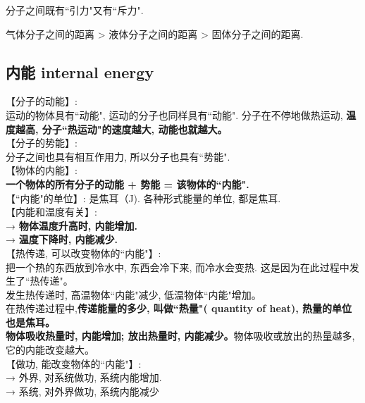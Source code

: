 \documentclass[UTF8]{ctexart}
\begin{document}
	分子之间既有``引力"又有``斥力".
	
	气体分子之间的距离 >  液体分子之间的距离 > 固体分子之间的距离.
	
	\vspace{1em} 
	
	
	
	\subsection{内能 internal energy}
	
	【分子的动能】: \\	
	运动的物体具有``动能", 运动的分子也同样具有``动能". 分子在不停地做热运动, \textbf{温度越高, 分子``热运动"的速度越大, 动能也就越大。} \\	
	
	【分子的势能】: \\
	分子之间也具有相互作用力, 所以分子也具有``势能". \\
		
	【物体的内能】: \\
	\textbf{一个物体的所有分子的动能 + 势能 = 该物体的``内能".}  \\
	
	
	【``内能"的单位】: 是焦耳（J). 各种形式能量的单位, 都是焦耳. \\
	
	【内能和温度有关】: \\
	→ \textbf{物体温度升高时, 内能增加.}  \\
	→ \textbf{温度下降时, 内能减少.} \\
	
	【热传递, 可以改变物体的``内能"】: \\
	把一个热的东西放到冷水中, 东西会冷下来, 而冷水会变热. 这是因为在此过程中发生了``热传递"。 \\
	发生热传递时, 高温物体``内能"减少, 低温物体``内能"增加。 \\
	
	在热传递过程中,\textbf{传递能量的多少, 叫做``热量"( quantity of heat), 热量的单位也是焦耳。} \\
	\textbf{物体吸收热量时, 内能增加; 放出热量时, 内能减少。}物体吸收或放出的热量越多, 它的内能改变越大。 \\
		
		
	【做功, 能改变物体的``内能"】: \\
	→ 外界, 对系统做功, 系统内能增加. \\
	→ 系统, 对外界做功, 系统内能减少 \\
	
\end{document}
